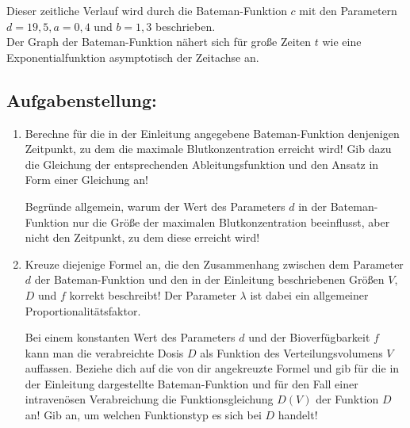\begin{langesbeispiel}
Dieser zeitliche Verlauf wird durch die Bateman-Funktion $c$ mit den Parametern $d=19,5,
 a=0,4$ und $b=1,3$ beschrieben.\\
Der Graph der Bateman-Funktion nähert sich für große Zeiten $t$ wie eine Exponentialfunktion
asymptotisch der Zeitachse an.

\subsection{Aufgabenstellung:}
\begin{enumerate}
	\item Berechne für die in der Einleitung angegebene Bateman-Funktion denjenigen Zeitpunkt, zu dem die maximale Blutkonzentration erreicht wird! Gib dazu die Gleichung der entsprechenden Ableitungsfunktion und den Ansatz in Form einer Gleichung an!
	
Begründe allgemein, warum der Wert des Parameters $d$ in der Bateman-Funktion nur
die Größe der maximalen Blutkonzentration beeinflusst, aber nicht den Zeitpunkt, zu dem
diese erreicht wird!

\item Kreuze diejenige Formel an, die den Zusammenhang zwischen dem Parameter $d$ der
Bateman-Funktion und den in der Einleitung beschriebenen Größen $V$, $D$ und $f$ korrekt beschreibt! Der Parameter $\lambda$ ist dabei ein allgemeiner Proportionalitätsfaktor.\leer

\leer
				
				Bei einem konstanten Wert des Parameters $d$ und der Bioverfügbarkeit $f$ kann man die
verabreichte Dosis $D$ als Funktion des Verteilungsvolumens $V$ auffassen. Beziehe dich auf die von dir angekreuzte Formel und gib für die in der Einleitung dargestellte Bateman-Funktion und für den Fall einer intravenösen Verabreichung die Funktionsgleichung $D(V)$ der Funktion $D$ an! Gib an, um welchen Funktionstyp es sich bei $D$ handelt!	
						\end{enumerate}\leer
				

\end{langesbeispiel}
